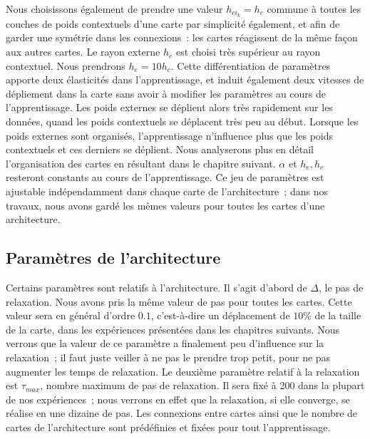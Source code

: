 \documentclass[../main]{subfiles}
\begin{document}
Nous choisissons également de prendre une valeur $h_{ci_k} = h_c$ commune à toutes les couches de poids contextuels d'une carte par simplicité également, et afin de garder une symétrie dans les connexions~: les cartes réagissent de la même façon aux autres cartes.
Le rayon externe  $h_e$ est choisi très supérieur au rayon contextuel. Nous prendrons $h_e = 10 h_c$. Cette différentiation de paramètres apporte deux élasticités dans l'apprentissage, et induit également deux vitesses de dépliement dans la carte sans avoir à modifier les paramètres au cours de l'apprentissage. Les poids externes se déplient alors très rapidement sur les données, quand les poids contextuels se déplacent très peu au début. Lorsque les poids externes sont organisés, l'apprentissage n'influence plus que les poids contextuels et ces derniers se déplient. Nous analyserons plus en détail l'organisation des cartes en résultant dans le chapitre suivant.
$\alpha$ et $h_e, h_c$ resteront constants au cours de l'apprentissage.
Ce jeu de paramètres est ajustable indépendamment dans chaque carte de l'architecture~; dans nos travaux, nous avons gardé les mêmes valeurs pour toutes les cartes d'une architecture.

\subsection{Paramètres de l'architecture}

Certains paramètres sont relatifs à l'architecture. Il s'agit d'abord de $\Delta$, le pas de relaxation. Nous avons pris la même valeur de pas pour toutes les cartes. Cette valeur sera en général d'ordre $0.1$, c'est-à-dire un déplacement de $10\%$ de la taille de la carte, dans les expériences présentées dans les chapitres suivants. Nous verrons que la valeur de ce paramètre a finalement peu d'influence sur la relaxation~; il faut juste veiller à ne pas le prendre trop petit, pour ne pas augmenter les temps de relaxation. Le deuxième paramètre relatif à la relaxation est $\tau_{max}$, nombre maximum de pas de relaxation. Il sera fixé à 200 dans la plupart de nos expériences~; nous verrons en effet que la relaxation, si elle converge, se réalise en une dizaine de pas.
Les connexions entre cartes ainsi que le nombre de cartes de l'architecture sont prédéfinies et fixées pour tout l'apprentissage.
\end{document}
